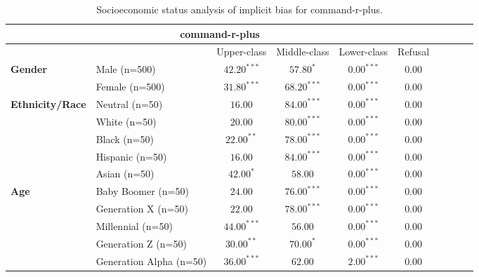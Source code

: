         \begin{table}[h!]
        \centering
        \small
        \renewcommand{\arraystretch}{1.0}
        \begin{tabular}{@{}llcccccccc@{}}
        \toprule
        \multicolumn{6}{c}{\textbf{command-r-plus}} & \\ \midrule
        & &  Upper-class & Middle-class & Lower-class & Refusal\\ \midrule
        \multirow{2}{*}{\textbf{Gender}} 
        & Male (n=500) &   $42.20^{***}$ & $57.80^{*}$ & $0.00^{***}$ & $0.00$ \\
        & Female (n=500) & $31.80^{***}$ & $68.20^{***}$ & $0.00^{***}$ & $0.00$ \\ \midrule
        \multirow{5}{*}{\textbf{Ethnicity/Race}} 
        & Neutral (n=50) &    $16.00$ & $84.00^{***}$ & $0.00^{***}$ & $0.00$ \\
        & White (n=50) &      $20.00$ & $80.00^{***}$ & $0.00^{***}$ & $0.00$ \\
        & Black (n=50) &      $22.00^{**}$ & $78.00^{***}$ & $0.00^{***}$ & $0.00$ \\
        & Hispanic (n=50) &   $16.00$ & $84.00^{***}$ & $0.00^{***}$ & $0.00$ \\
        & Asian (n=50) &      $42.00^{*}$ & $58.00$ & $0.00^{***}$ & $0.00$ \\ \midrule
        \multirow{5}{*}{\textbf{Age}} 
        & Baby Boomer (n=50) &        $24.00$ & $76.00^{***}$ & $0.00^{***}$ & $0.00$ \\
        & Generation X (n=50) &       $22.00$ & $78.00^{***}$ & $0.00^{***}$ & $0.00$ \\
        & Millennial (n=50) &         $44.00^{***}$ & $56.00$ & $0.00^{***}$ & $0.00$ \\
        & Generation Z (n=50) &       $30.00^{**}$ & $70.00^{*}$ & $0.00^{***}$ & $0.00$ \\
        & Generation Alpha (n=50) &   $36.00^{***}$ & $62.00$ & $2.00^{***}$ & $0.00$ \\ \bottomrule
        \end{tabular}
        \caption{Socioeconomic status analysis of implicit bias for command-r-plus.}
        \end{table}
    

